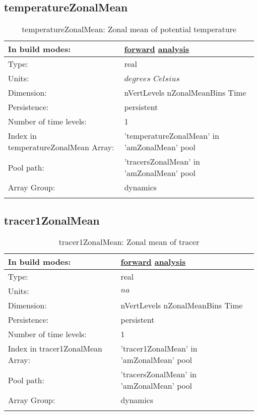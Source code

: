 \subsection[temperatureZonalMean]{temperatureZonalMean}
\label{subsec:var_sec_amZonalMean_temperatureZonalMean}
\begin{center}
\begin{longtable}{| p{2.0in} | p{4.0in} |}
        \hline 
        In build modes: & \hyperref[subsec:forward_var_tab_amZonalMean]{forward} \hyperref[subsec:analysis_var_tab_amZonalMean]{analysis} \\
        \hline 
        Type: & real \\
        \hline 
        Units: & $degrees$ $Celsius$ \\
        \hline 
        Dimension: & nVertLevels nZonalMeanBins Time \\
        \hline 
        Persistence: & persistent \\
        \hline 
        Number of time levels: & 1 \\
        \hline 
		 Index in temperatureZonalMean Array: & 'temperatureZonalMean' in 'amZonalMean' pool \\
		 \hline 
            Pool path: & 'tracersZonalMean' in 'amZonalMean' pool
 \\
		 \hline 
		 Array Group: & dynamics \\
		 \hline 
    \caption{temperatureZonalMean: Zonal mean of potential temperature}
\end{longtable}
\end{center}
\subsection[tracer1ZonalMean]{tracer1ZonalMean}
\label{subsec:var_sec_amZonalMean_tracer1ZonalMean}
\begin{center}
\begin{longtable}{| p{2.0in} | p{4.0in} |}
        \hline 
        In build modes: & \hyperref[subsec:forward_var_tab_amZonalMean]{forward} \hyperref[subsec:analysis_var_tab_amZonalMean]{analysis} \\
        \hline 
        Type: & real \\
        \hline 
        Units: & $na$ \\
        \hline 
        Dimension: & nVertLevels nZonalMeanBins Time \\
        \hline 
        Persistence: & persistent \\
        \hline 
        Number of time levels: & 1 \\
        \hline 
		 Index in tracer1ZonalMean Array: & 'tracer1ZonalMean' in 'amZonalMean' pool \\
		 \hline 
            Pool path: & 'tracersZonalMean' in 'amZonalMean' pool
 \\
		 \hline 
		 Array Group: & dynamics \\
		 \hline 
    \caption{tracer1ZonalMean: Zonal mean of tracer}
\end{longtable}
\end{center}
